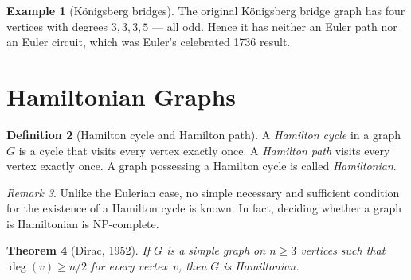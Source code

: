 \documentclass[12pt,a4paper,openany]{book}
\theoremstyle{definition}
\newtheorem{definition}{Definition}[chapter]
\newtheorem{example}[definition]{Example}
\theoremstyle{plain}
\newtheorem{theorem}[definition]{Theorem}
\theoremstyle{remark}
\newtheorem{remark}[definition]{Remark}
\begin{document}
\begin{example}[K\"onigsberg bridges]
\label{ex:konigsberg}
The original K\"onigsberg bridge graph has four vertices with degrees
$3,3,3,5$ --- all odd.  Hence it has neither an Euler path nor an Euler
circuit, which was Euler's celebrated 1736 result.

\begin{center}
\end{center}
\end{example}


\section{Hamiltonian Graphs}
\label{sec:hamilton}

\begin{definition}[Hamilton cycle and Hamilton path]
\label{def:hamilton-cycle}
A \emph{Hamilton cycle} in a graph $G$ is a cycle that visits every
vertex exactly once.  A \emph{Hamilton path} visits every vertex
exactly once.  A graph possessing a Hamilton cycle is called
\emph{Hamiltonian}.
\end{definition}

\begin{remark}
Unlike the Eulerian case, no simple necessary and sufficient condition
for the existence of a Hamilton cycle is known.  In fact, deciding
whether a graph is Hamiltonian is NP-complete.
\end{remark}

\begin{theorem}[Dirac, 1952]
\label{thm:dirac}
If $G$ is a simple graph on $n\ge 3$ vertices such that
$\deg(v)\ge n/2$ for every vertex~$v$, then $G$ is Hamiltonian.
\end{theorem}
\end{document}
